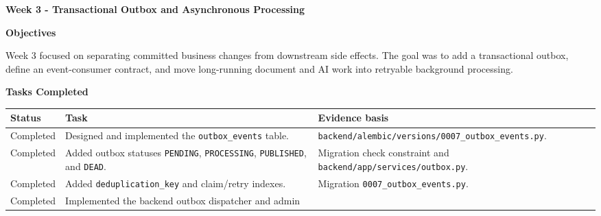 \vspace{0.5em}\noindent\textbf{Week 3 - Transactional Outbox and Asynchronous
Processing}\par

\vspace{0.5em}\noindent\textbf{Objectives}\par

Week 3 focused on separating committed business changes from downstream
side effects. The goal was to add a transactional outbox, define an
event-consumer contract, and move long-running document and AI work into
retryable background processing.

\vspace{0.5em}\noindent\textbf{Tasks Completed}\par

{
\begingroup
\small
\setlength{\tabcolsep}{3pt}
\renewcommand{\arraystretch}{1.15}
\begin{longtable}{@{}
  >{\raggedright\arraybackslash}p{}
  >{\raggedright\arraybackslash}p{}
  >{\raggedright\arraybackslash}p{}@{}}
\toprule\noalign{}
\begin{minipage}[b]{\linewidth}\raggedright
Status
\end{minipage} & \begin{minipage}[b]{\linewidth}\raggedright
Task
\end{minipage} & \begin{minipage}[b]{\linewidth}\raggedright
Evidence basis
\end{minipage} \\
\midrule\noalign{}
\endhead
\bottomrule\noalign{}
\endlastfoot
Completed & Designed and implemented the \texttt{outbox\_\allowbreak{}events} table.
& \texttt{backend/\allowbreak{}alembic/\allowbreak{}versions/\allowbreak{}0007\_\allowbreak{}outbox\_\allowbreak{}events.\allowbreak{}py}. \\
Completed & Added outbox statuses \texttt{PENDING}, \texttt{PROCESSING},
\texttt{PUBLISHED}, and \texttt{DEAD}. & Migration check constraint and
\texttt{backend/\allowbreak{}app/\allowbreak{}services/\allowbreak{}outbox.\allowbreak{}py}. \\
Completed & Added \texttt{deduplication\_\allowbreak{}key} and claim/retry indexes. &
Migration \texttt{0007\_\allowbreak{}outbox\_\allowbreak{}events.\allowbreak{}py}. \\
Completed & Implemented the backend outbox dispatcher and admin

\end{longtable}}
